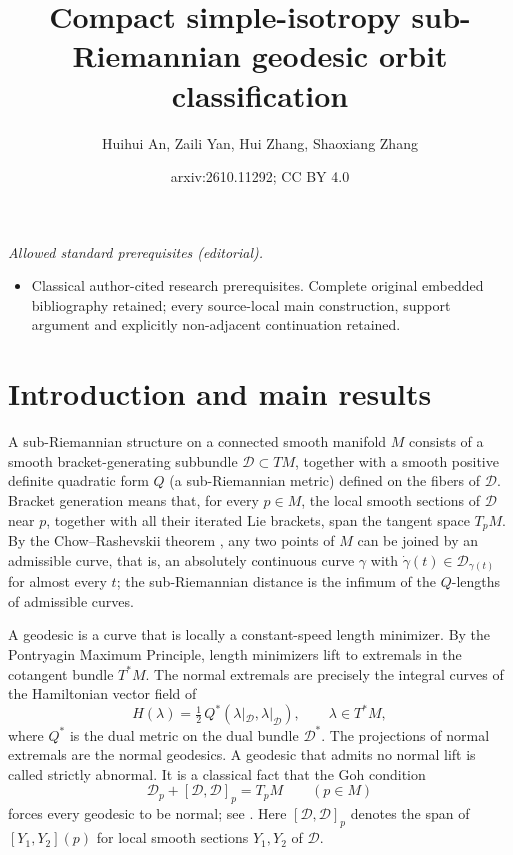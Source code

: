 \documentclass[12pt]{amsart}
\title{Compact simple-isotropy sub-Riemannian geodesic orbit classification}
\author{Huihui An, Zaili Yan, Hui Zhang, Shaoxiang Zhang}
\date{arxiv:2610.11292; CC BY 4.0}
\theoremstyle{plain}
\theoremstyle{definition}
\theoremstyle{remark}
\begin{document}
\maketitle
\noindent\textit{Allowed standard prerequisites (editorial).}\begin{itemize}
\item Classical author-cited research prerequisites. Complete original embedded bibliography retained; every source-local main construction, support argument and explicitly non-adjacent continuation retained.
\end{itemize}\medskip
\section{Introduction and main results}\label{sec:intro}

A sub-Riemannian structure on a connected smooth manifold $M$ consists of a smooth
bracket-generating subbundle $\mathcal{D}\subset TM$, together with a smooth positive definite
quadratic form $Q$ (a sub-Riemannian metric) defined on the fibers of $\mathcal{D}$. Bracket
generation means that, for every $p\in M$, the local smooth sections of $\mathcal{D}$ near $p$,
together with all their iterated Lie brackets, span the tangent space $T_pM$. By the
Chow--Rashevskii theorem \cite{Chow,Rashevskii}, any two points of $M$ can be joined by an
admissible curve, that is, an absolutely continuous curve $\gamma$ with
$\dot{\gamma}(t)\in\mathcal{D}_{\gamma(t)}$ for almost every $t$; the sub-Riemannian distance is
the infimum of the $Q$-lengths of admissible curves.

A geodesic is a curve that is locally a constant-speed length minimizer. By the Pontryagin Maximum
Principle, length minimizers lift to extremals in the cotangent bundle $T^*M$. The normal
extremals are precisely the integral curves of the Hamiltonian vector field of
\begin{equation}\label{eq:ham}
H(\lambda)=\tfrac12\,Q^{*}(\lambda|_{\mathcal{D}},\lambda|_{\mathcal{D}}),\qquad \lambda\in T^*M,
\end{equation}
where $Q^{*}$ is the dual metric on the dual bundle $\mathcal{D}^{*}$. The projections of normal
extremals are the normal geodesics. A geodesic that admits no normal lift is called
strictly abnormal. It is a classical fact that the Goh condition
\begin{equation}\label{eq:goh}
\mathcal{D}_p+[\mathcal{D},\mathcal{D}]_p=T_pM\qquad(p\in M)
\end{equation}
forces every geodesic to be normal; see \cite[Corollary 12.14]{Agrachev}. Here
$[\mathcal{D},\mathcal{D}]_p$ denotes the span of $[Y_1,Y_2](p)$ for local smooth sections
$Y_1,Y_2$ of $\mathcal{D}$.
\end{document}
